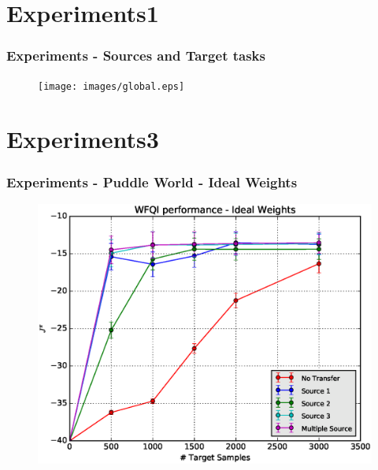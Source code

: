 \documentclass[professionalfont]{beamer}
\begin{document}
    \section{Experiments1}
      \begin{frame}
      \frametitle{Experiments - Sources and Target tasks}
      \begin{figure}
        \texttt{[image: images/global.eps]}
      \end{figure}
      \end{frame}

    \section{Experiments3}
      \begin{frame}
      \frametitle{Experiments - Puddle World - Ideal Weights}
        \begin{figure}
          \includegraphics[scale=0.5]{images/WFQIPerf_ID.eps}
          \label{}
        \end{figure}
      \end{frame}
\end{document}
